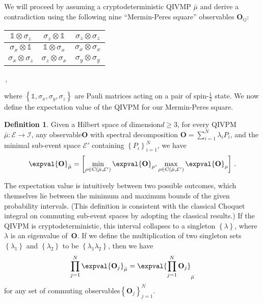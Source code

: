 \documentclass[english,reprint, aps, prl,superscriptaddress, showpacs,
showkeys, longbibliography, amsmath, amssymb]{revtex4-1}
\theoremstyle{plain}
\theoremstyle{definition}
\newtheorem{definition}[thm]{Definition}
\newcommand{\events}{\ensuremath{\mathcal{E}}}
\newcommand{\coreBorn}{\ensuremath{\mathrm{C}}}
\newcommand{\nb}{\nolinebreak[1] }
\begin{document}
We will proceed by assuming a cryptodeterministic QIVMP $\bar{\mu}$
and derive a contradiction using the following nine ``Mermin-Peres square''
observables $\mathbf{O}_{ij}$\nb\cite{Mermin1990Simple,peres1995quantum}:
\begin{center}
\begin{tabular}{|c|c|c|}
\hline 
$\mathbb{1}\otimes\sigma_{z}$  & $\sigma_{z}\otimes\mathbb{1}$  & $\sigma_{z}\otimes\sigma_{z}$ \tabularnewline
\hline 
$\sigma_{x}\otimes\mathbb{1}$  & $\mathbb{1}\otimes\sigma_{x}$  & $\sigma_{x}\otimes\sigma_{x}$ \tabularnewline
\hline 
$\sigma_{x}\otimes\sigma_{z}$  & $\sigma_{z}\otimes\sigma_{x}$  & $\sigma_{y}\otimes\sigma_{y}$ \tabularnewline
\hline 
\end{tabular}\,,
\par\end{center}

\noindent where $\left\{\mathbb{1},\sigma_{x},\sigma_{y},\sigma_{z}\right\}$ are
Pauli matrices acting on a pair of spin-$\frac{1}{2}$ state. We now define the
expectation value of the QIVPM for our Mermin-Peres square.

\begin{definition}Given a Hilbert space of dimension\nb$d\ge3$, for every
  QIVPM\nb$\bar{\mu}:\events\rightarrow\mathscr{I}$, any
  observable\nb$\mathbf{O}$ with spectral decomposition
  $\mathbf{O}=\sum_{i=1}^{N}\lambda_{i}P_{i}$, and the minimal
  sub-event space $\events'$ containing
  $\left\{ P_{i}\right\} _{i=1}^{N}$, we have
\begin{equation}
\expval{\mathbf{O}}_{\bar{\mu}}=\left[\min_{\rho\in\coreBorn\left(\bar{\mu},\events'\right)}\expval{\mathbf{O}}_{\rho},\max_{\rho\in\coreBorn\left(\bar{\mu},\events'\right)}\expval{\mathbf{O}}_{\rho}\right]\,.\label{eq:quantum-interval-expectation-core}
\end{equation}
\end{definition}

The expectation value is intuitively between two possible outcomes,
which themselves lie between the minimum and maximum bounds of the given
probability intervals. (This definition is consistent with the
classical Choquet integral on commuting sub-event spaces by adopting
the classical
results\nb\cite{GilboaSchmeidler1994,Grabisch2016}.)
If the QIVPM is cryptodeterministic, this interval collapses to a
singleton $\left\{ \lambda\right\} $, where $\lambda$ is an eigenvalue
of~$\mathbf{O}$. If we define the multiplication of two singleton
sets\nb$\left\{ \lambda_{1}\right\} $ and
$\left\{ \lambda_{2}\right\} $ to be
$\left\{ \lambda_{1}\lambda_{2}\right\} $, then we have
\begin{equation}
\prod_{j=1}^{N}\expval{\mathbf{O}_{j}}_{\bar{\mu}}=\expval{\prod_{j=1}^{N}\mathbf{O}_{j}}_{\bar{\mu}}\label{eq:Kochen-Specker-Rules}
\end{equation}
for any set of commuting observables\nb$\left\{ \mathbf{O}_{j}\right\}
_{j=1}^{N}$.
\end{document}
